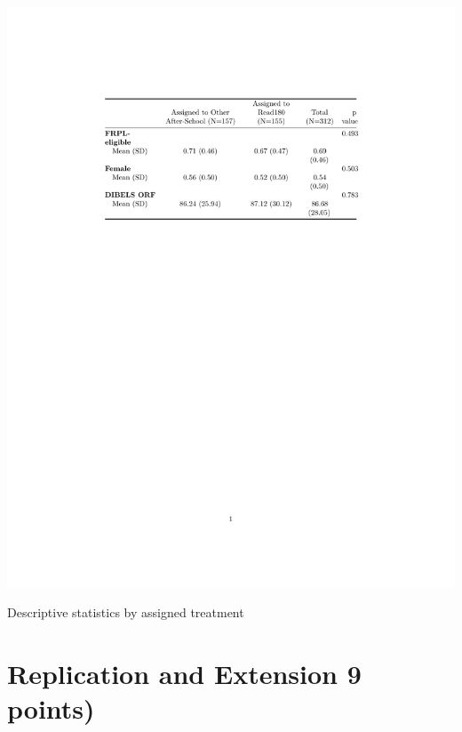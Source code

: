 \documentclass[a4paper, 11pt]{article}
\begin{document}
\begin{table} 
	\begin{center}
\includegraphics{tables/descriptives.pdf}
			\caption{Descriptive statistics by assigned treatment} \label{tab:descriptives}
\end{center}
\end{table}

\section{Replication and Extension 9 points)}
\end{document}
